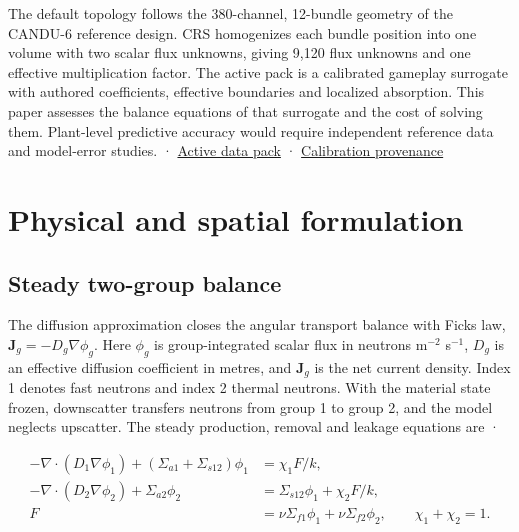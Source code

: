 \documentclass[11pt,letterpaper]{article}
\begin{document}
The default topology follows the 380-channel, 12-bundle geometry of the CANDU-6
reference design. CRS homogenizes each bundle position into one volume with two scalar
flux unknowns, giving 9,120 flux unknowns and one effective multiplication factor. The
active pack is a calibrated gameplay surrogate with authored coefficients, effective
boundaries and localized absorption. This paper assesses the balance equations of that
surrogate and the cost of solving them. Plant-level predictive accuracy would require
independent reference data and model-error studies. \cite{ref-1} ·
\href{https://github.com/hkkho/CRS/blob/4341ae8881f5827988c3d8b1859aa9e8f13cd8a6/data/packs/candu6-two-group-diffusion-pack-v1.json}{Active
data pack} ·
\href{https://github.com/hkkho/CRS/blob/4341ae8881f5827988c3d8b1859aa9e8f13cd8a6/docs/physics/calibration-provenance.md}{Calibration
provenance}

\section{Physical and spatial formulation}\label{physical-and-spatial-formulation}

\subsection{Steady two-group balance}\label{steady-two-group-balance}

The diffusion approximation closes the angular transport balance with
Fick\textquotesingle s law, \(\mathbf J_g=-D_g\nabla\phi_g\). Here \(\phi_g\) is
group-integrated scalar flux in neutrons m\(^{-2}\) s\(^{-1}\), \(D_g\) is an effective
diffusion coefficient in metres, and \(\mathbf J_g\) is the net current density. Index 1
denotes fast neutrons and index 2 thermal neutrons. With the material state frozen,
downscatter transfers neutrons from group 1 to group 2, and the model neglects
upscatter. The steady production, removal and leakage equations are \cite{ref-2} ·
\cite{ref-3}

\begin{equation}
\label{eq:group-balance}
\begin{aligned}
-\nabla\cdot(D_1\nabla\phi_1)+(\Sigma_{a1}+\Sigma_{s12})\phi_1
 &= \chi_1 F/k,\\
-\nabla\cdot(D_2\nabla\phi_2)+\Sigma_{a2}\phi_2
 &= \Sigma_{s12}\phi_1+\chi_2 F/k,\\
F &= \nu\Sigma_{f1}\phi_1+\nu\Sigma_{f2}\phi_2,
\qquad \chi_1+\chi_2=1.
\end{aligned}
\end{equation}
\end{document}
